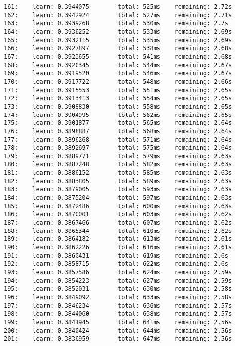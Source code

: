 \documentclass[11pt]{article}
\begin{document}
\begin{Verbatim}[commandchars=\\\{\}]
161:    learn: 0.3944075        total: 525ms    remaining: 2.72s
162:    learn: 0.3942924        total: 527ms    remaining: 2.71s
163:    learn: 0.3939268        total: 530ms    remaining: 2.7s
164:    learn: 0.3936252        total: 533ms    remaining: 2.69s
165:    learn: 0.3932115        total: 535ms    remaining: 2.69s
166:    learn: 0.3927897        total: 538ms    remaining: 2.68s
167:    learn: 0.3923655        total: 541ms    remaining: 2.68s
168:    learn: 0.3920345        total: 544ms    remaining: 2.67s
169:    learn: 0.3919520        total: 546ms    remaining: 2.67s
170:    learn: 0.3917722        total: 548ms    remaining: 2.66s
171:    learn: 0.3915553        total: 551ms    remaining: 2.65s
172:    learn: 0.3913413        total: 554ms    remaining: 2.65s
173:    learn: 0.3908830        total: 558ms    remaining: 2.65s
174:    learn: 0.3904995        total: 562ms    remaining: 2.65s
175:    learn: 0.3901877        total: 565ms    remaining: 2.64s
176:    learn: 0.3898887        total: 568ms    remaining: 2.64s
177:    learn: 0.3896268        total: 571ms    remaining: 2.64s
178:    learn: 0.3892697        total: 575ms    remaining: 2.64s
179:    learn: 0.3889771        total: 579ms    remaining: 2.63s
180:    learn: 0.3887248        total: 582ms    remaining: 2.63s
181:    learn: 0.3886152        total: 585ms    remaining: 2.63s
182:    learn: 0.3883805        total: 589ms    remaining: 2.63s
183:    learn: 0.3879005        total: 593ms    remaining: 2.63s
184:    learn: 0.3875204        total: 597ms    remaining: 2.63s
185:    learn: 0.3872486        total: 600ms    remaining: 2.63s
186:    learn: 0.3870001        total: 603ms    remaining: 2.62s
187:    learn: 0.3867466        total: 607ms    remaining: 2.62s
188:    learn: 0.3865344        total: 610ms    remaining: 2.62s
189:    learn: 0.3864182        total: 613ms    remaining: 2.61s
190:    learn: 0.3862226        total: 616ms    remaining: 2.61s
191:    learn: 0.3860431        total: 619ms    remaining: 2.6s
192:    learn: 0.3858715        total: 622ms    remaining: 2.6s
193:    learn: 0.3857586        total: 624ms    remaining: 2.59s
194:    learn: 0.3854223        total: 627ms    remaining: 2.59s
195:    learn: 0.3852031        total: 630ms    remaining: 2.58s
196:    learn: 0.3849092        total: 633ms    remaining: 2.58s
197:    learn: 0.3846234        total: 636ms    remaining: 2.57s
198:    learn: 0.3844060        total: 638ms    remaining: 2.57s
199:    learn: 0.3841945        total: 641ms    remaining: 2.56s
200:    learn: 0.3840424        total: 644ms    remaining: 2.56s
201:    learn: 0.3836959        total: 647ms    remaining: 2.56s

\end{Verbatim}
\end{document}
